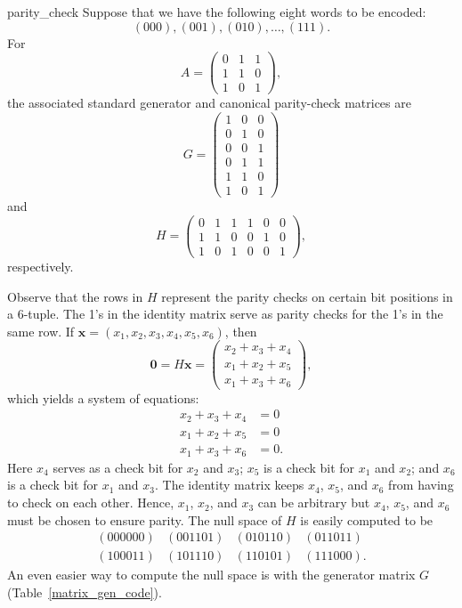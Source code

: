  
\begin{example}{parity_check}
Suppose that we have the following eight words to be
encoded:
\[
(000), (001), (010), \ldots, (111).
\] 
For
\[
A =
\begin{pmatrix}
0 & 1 & 1 \\
1 & 1 & 0 \\
1 & 0 & 1
\end{pmatrix},
\]
the associated standard generator and canonical parity-check matrices
are 
\[
G=
\begin{pmatrix}
1 & 0 & 0 \\
0 & 1 & 0 \\
0 & 0 & 1 \\
0 & 1 & 1 \\
1 & 1 & 0 \\
1 & 0 & 1
\end{pmatrix}
\]
and
\[
H =
\begin{pmatrix}
0 & 1 & 1 & 1 & 0 & 0 \\
1 & 1 & 0 & 0 & 1 & 0 \\
1 & 0 & 1 & 0 & 0 & 1
\end{pmatrix},
\]
respectively.
 
 
Observe that the rows in $H$  represent the parity checks on certain
bit positions in a 6-tuple. The 1's in the identity matrix serve as
parity checks for the 1's in the same row. If ${\mathbf x} = (x_1, x_2,
x_3, x_4, x_5, x_6)$, then 
\[
{\mathbf 0}
=
H{\mathbf x}
=
\begin{pmatrix}
x_2 + x_3 + x_4 \\
x_1 + x_2 + x_5\\
x_1 + x_3 + x_6
\end{pmatrix},
\]
which yields a system of equations:
\begin{align*}
x_2 + x_3 + x_4 & = 0 \\
x_1 + x_2 + x_5 & = 0 \\
x_1 + x_3 + x_6 & = 0.
\end{align*}
Here $x_4$ serves as a check bit for $x_2$ and $x_3$; $x_5$ is a check
bit for $x_1$ and $x_2$; and $x_6$ is a check bit for $x_1$ and $x_3$.
The identity matrix keeps $x_4$, $x_5$, and $x_6$ from having to check
on each other. Hence, $x_1$, $x_2$, and $x_3$ can be arbitrary but
$x_4$, $x_5$, and $x_6$ must be chosen to ensure parity. The null
space of $H$ is easily computed to be
\[
\begin{array}{cccc}
 (000000) & (001101) & (010110) & (011011) \\
 (100011) & (101110) & (110101) & (111000).
\end{array}
\]
An even easier way to compute the null space is with the generator
matrix $G$ (Table~\ref{matrix_gen_code}). 
\end{example}
 
